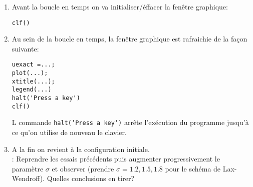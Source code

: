 \documentclass[12pt,a4paper]{article}
\begin{document}
\begin{enumerate}
\item Avant la boucle en temps on va initialiser/\'effacer la fen\^etre graphique:
\begin{verbatim}
clf()
\end{verbatim}

\item Au sein de la boucle en temps, la fen\^etre graphique est
rafraichie de la fa\c{c}on suivante: 
\begin{verbatim}
uexact =...;
plot(...); 
xtitle(...); 
legend(...)
halt('Press a key') 
clf()
\end{verbatim}
L commande \texttt{halt('Press a key')} arr\^ete l'ex\'ecution du
programme jusqu'\`a ce qu'on utilise de nouveau le clavier.\\

\item A la fin on revient \`a la configuration initiale.\\

: Reprendre les essais pr\'ec\'edents puis augmenter
progressivement le param\`etre $\sigma$ et observer (prendre
$\sigma=1.2,1.5,1.8$ pour le sch\'ema de Lax-Wendroff). Quelles
conclusions en tirer?
\end{enumerate}
\end{document}
